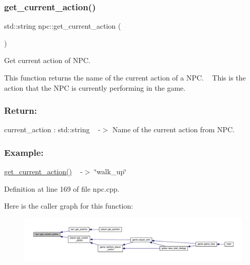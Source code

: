 \subsubsection{\texorpdfstring{get\+\_\+current\+\_\+action()}{get\_current\_action()}}
{\footnotesize\ttfamily std\+::string npc\+::get\+\_\+current\+\_\+action (\begin{DoxyParamCaption}{ }\end{DoxyParamCaption})}



Get current action of N\+PC. 

This function returns the name of the current action of a N\+PC. ~\newline
This is the action that the N\+PC is currently performing in the game.~\newline


\subsubsection*{Return\+: }

current\+\_\+action \+: std\+::string ~\newline
-\/$>$ Name of the current action from N\+PC.

\subsubsection*{Example\+: }

\hyperlink{classnpc_a61315bb51941237b6b2c0fb578f3e5ee}{get\+\_\+current\+\_\+action()} ~\newline
-\/$>$ \char`\"{}walk\+\_\+up\char`\"{} 

Definition at line 169 of file npc.\+cpp.

Here is the caller graph for this function\+:
\nopagebreak
\begin{figure}[H]
\begin{center}
\leavevmode
\includegraphics[width=350pt]{classnpc_a61315bb51941237b6b2c0fb578f3e5ee_icgraph}
\end{center}
\end{figure}
\mbox{\label{classnpc_a2714b410c2e644040f69f1cf50d3bc50}} 

